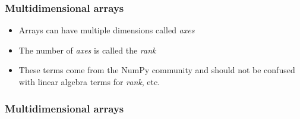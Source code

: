\documentclass[12pt,letterpaper,twoside]{article}
\begin{document}
\begin{python}
\begin{Highlighting}[]
\NormalTok{b[}\NormalTok{] }\OperatorTok{=} 
\end{Highlighting}
\end{python}

\hypertarget{multidimensional-arrays}{%
\subsubsection{Multidimensional arrays}\label{multidimensional-arrays}}

\begin{itemize}
\item
  Arrays can have multiple dimensions called \emph{axes}
\item
  The number of \emph{axes} is called the \emph{rank}
\item
  These terms come from the NumPy community and should not be confused
  with linear algebra terms for \emph{rank}, etc.
\end{itemize}

\hypertarget{multidimensional-arrays-1}{%
\subsubsection{Multidimensional
arrays}\label{multidimensional-arrays-1}}

\begin{python}
\begin{Highlighting}[]
\OperatorTok{=}\NormalTok{ np.array([(}\NormalTok{, }\NormalTok{, }\NormalTok{), (}\NormalTok{, }\NormalTok{, }\NormalTok{)], dtype}\OperatorTok{=}
\end{Highlighting}
\end{python}

\begin{python}
\begin{Highlighting}[]
\end{Highlighting}
\end{python}

\begin{python}
\begin{Highlighting}[]
\end{Highlighting}
\end{python}
\end{document}
